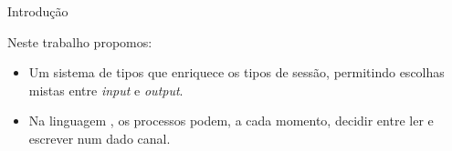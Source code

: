 \begin{frame}[fragile]{Introdução}

Neste trabalho propomos:
\begin{itemize}
\item Um sistema de tipos que enriquece os tipos de sessão, permitindo escolhas mistas entre \textit{input} e \textit{output}.
  \vspace{2mm}
  \pause
\item Na linguagem \mixedchoice, os processos podem, a cada momento, decidir entre ler e escrever num dado canal.
\end{itemize}

\end{frame}


